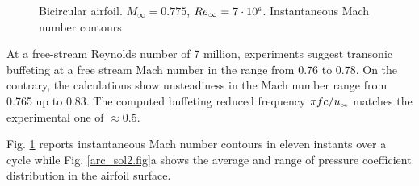 \begin{figure}[ht]
\begin{center}
\begin{tabular}{ccc}
  \end{tabular}
 \end{center}
 \vspace{-5mm}
 \caption{Bicircular airfoil. $M_\infty = 0.775$,
          $Re_\infty = 7\cdot10^{\mbox{\tiny $6$}}$. Instantaneous Mach number contours}
 \label{arc_sol1.fig}
\end{figure}
%
 At a free-stream Reynolds number of 7 million, experiments suggest
 transonic buffeting at a free stream Mach number in the range
 from 0.76 to 0.78. On the contrary, the calculations show
 unsteadiness in the Mach number range from 0.765 up to 0.83.
 The computed buffeting reduced frequency $\pi f c/u_{\mbox{\tiny $\infty$}}$
 matches the experimental one of $\approx 0.5$.

 Fig. \ref{arc_sol1.fig} reports instantaneous Mach number contours
 in eleven instants over a cycle while Fig. \ref{arc_sol2.fig}a
 shows the average and range of pressure coefficient distribution
 in the airfoil surface.
%
